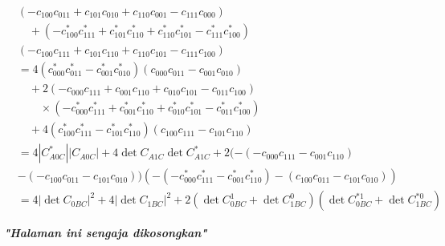 \begin{equation}
\begin{aligned}
		&(-c_{100} c_{011}
		+ c_{101} c_{010}
		+ c_{110} c_{001}
		- c_{111} c_{000}) \\
		&\quad + (-c^{*}_{100} c^{*}_{111}
		+ c^{*}_{101} c^{*}_{110}
		+ c^{*}_{110} c^{*}_{101}
		- c^{*}_{111} c^{*}_{100})\\
		&(-c_{100} c_{111}
		+ c_{101} c_{110}
		+ c_{110} c_{101}
		- c_{111} c_{100})\\
		&= 4 (c^{*}_{000} c^{*}_{011}
		- c^{*}_{001} c^{*}_{010})
		(c_{000} c_{011}
		- c_{001} c_{010}) \\
		&\quad + 2 (-c_{000} c_{111}
		+ c_{001} c_{110}
		+ c_{010} c_{101}
		- c_{011} c_{100}) \\
		&\qquad \times
		(-c^{*}_{000} c^{*}_{111}
		+ c^{*}_{001} c^{*}_{110}
		+ c^{*}_{010} c^{*}_{101}
		- c^{*}_{011} c^{*}_{100}) \\
		&\quad + 4 (c^{*}_{100} c^{*}_{111}
		- c^{*}_{101} c^{*}_{110})
		(c_{100} c_{111}
		- c_{101} c_{110})\\
		&= 4 |C_{A0C}^{*}| |C_{A0C}|+ 4 \det C_{A1C} \det C_{A1C}^{*}+2(-(-c_{000}c_{111}-c_{001}c_{110})\\
		&-(-c_{100}c_{011}-c_{101}c_{010}))(-(-c^{*}_{000} c^{*}_{111}-c^{*}_{001} c^{*}_{110})-(c_{100}c_{011}-c_{101}c_{010}))\\
		&= 4 |\det C_{0BC}|^2
		+ 4 |\det C_{1BC}|^2
		+ 2 (\det C_{0BC}^1 + \det C_{1BC}^0)(\det C^{*1}_{0BC} + \det C^{*0}_{1BC})
	\end{aligned}
\end{equation}

\newpage
\thispagestyle{empty}
\begin{center}
	\vspace*{\fill}
	\textit{\textbf{"Halaman ini sengaja dikosongkan"}}
	\vspace*{\fill}
\end{center}
\pagebreak